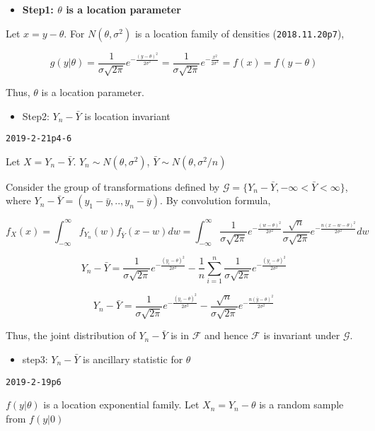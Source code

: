 \documentclass[12pt,]{article}
\providecommand{\tightlist}{%
  \setlength{\itemsep}{0pt}\setlength{\parskip}{0pt}}
\begin{document}
\begin{itemize}
\tightlist
\item
  \textbf{Step1: \(\theta\) is a location parameter}
\end{itemize}

Let \(x=y-\theta\). For \(N(\theta,\sigma^2)\) is a location family of
densities (\texttt{2018.11.20p7}),

\[g(y|\theta)=\frac1{\sigma\sqrt{2\pi}}e^{-\frac{(y-\theta)^2}{2\sigma^2}}=\frac1{\sigma\sqrt{2\pi}}e^{-\frac{x^2}{2\sigma^2}}=f(x)=f(y-\theta)\]

Thus, \(\theta\) is a location parameter.

\begin{itemize}
\tightlist
\item
  Step2: \(Y_n-\bar Y\) is location invariant
\end{itemize}

\texttt{2019-2-21p4-6}

Let \(X=Y_n-\bar Y\). \(Y_n\sim N(\theta,\sigma^2)\),
\(\bar Y\sim N(\theta,\sigma^2/n)\)

Consider the group of transformations defined by
\(\mathcal{G}=\{Y_n-\bar Y,-\infty<\bar Y<\infty\}\), where
\(Y_n-\bar Y=(y_1-\bar y,..,y_n-\bar y)\). By convolution formula,

\[f_X(x)=\int^{\infty}_{-\infty}f_{Y_n}(w)f_{\bar Y}(x-w)dw=\int^{\infty}_{-\infty}\frac1{\sigma\sqrt{2\pi}}e^{-\frac{(w-\theta)^2}{2\sigma^2}}\frac{\sqrt{n}}{\sigma\sqrt{2\pi}}e^{-\frac{n(x-w-\theta)^2}{2\sigma^2}}dw\]

\[Y_n-\bar Y=\frac1{\sigma\sqrt{2\pi}}e^{-\frac{(y_i-\theta)^2}{2\sigma^2}}-\frac1n\sum_{i=1}^n\frac1{\sigma\sqrt{2\pi}}e^{-\frac{(y_i-\theta)^2}{2\sigma^2}}\]

\[Y_n-\bar Y=\frac1{\sigma\sqrt{2\pi}}e^{-\frac{(y_i-\theta)^2}{2\sigma^2}}-\frac{\sqrt{n}}{\sigma\sqrt{2\pi}}e^{-\frac{n(\bar y-\theta)^2}{2\sigma^2}}\]

Thus, the joint distribution of \(Y_n-\bar Y\) is in \(\mathcal{F}\) and
hence \(\mathcal{F}\) is invariant under \(\mathcal{G}\).

\begin{itemize}
\tightlist
\item
  step3: \(Y_n-\bar Y\) is ancillary statistic for \(\theta\)
\end{itemize}

\texttt{2019-2-19p6}

\(f(y|\theta)\) is a location exponential family. Let \(X_n=Y_n-\theta\)
is a random sample from \(f(y|0)\)
\end{document}
